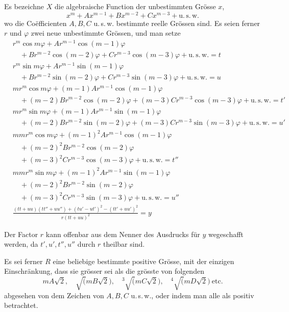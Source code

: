 Es bezeichne $X$ die algebraische Function der unbestimmten Grösse $x$,
\[
x^m+Ax^{m-1}+Bx^{m-2}+Cx^{m-3}+\mathrm{u.\,s.\,w.}
\]
wo die Coëfficienten $A,B,C$ u.\,s.\,w. bestimmte reelle
Grössen sind. Es seien ferner $r$ und $\varphi$ zwei neue unbestimmte
Grössen, und man setze
\[
\begin{aligned}
&r^m\cos m\varphi+Ar^{m-1}\cos(m-1)\varphi
\\
&\quad+Br^{m-2}\cos(m-2)\varphi+Cr^{m-3}\cos(m-3)\varphi
+\mathrm{u.\,s.\,w.}=t\\
&r^m\sin m\varphi+Ar^{m-1}\sin(m-1)\varphi
\\
&\quad+Br^{m-2}\sin(m-2)\varphi+Cr^{m-3}\sin(m-3)\varphi
+\mathrm{u.\,s.\,w.}=u\\
&mr^m\cos m\varphi+(m-1)Ar^{m-1}\cos(m-1)\varphi
\\
&\quad+(m-2)Br^{m-2}\cos(m-2)\varphi+(m-3)Cr^{m-3}\cos(m-3)\varphi
+\mathrm{u.\,s.\,w.}=t'\\
&mr^m\sin m\varphi+(m-1)Ar^{m-1}\sin(m-1)\varphi
\\
&\quad+(m-2)Br^{m-2}\sin(m-2)\varphi+(m-3)Cr^{m-3}\sin(m-3)\varphi
+\mathrm{u.\,s.\,w.}=u'\\
&mmr^m\cos m\varphi+(m-1)^2Ar^{m-1}\cos(m-1)\varphi
\\
&\quad+(m-2)^2Br^{m-2}\cos(m-2)\varphi\\
&\quad+(m-3)^2Cr^{m-3}\cos(m-3)\varphi
+\mathrm{u.\,s.\,w.}=t''\\
&mmr^m\sin m\varphi+(m-1)^2Ar^{m-1}\sin(m-1)\varphi
\\
&\quad+(m-2)^2Br^{m-2}\sin(m-2)\varphi\\
&\quad+(m-3)^2Cr^{m-3}\sin(m-3)\varphi
+\mathrm{u.\,s.\,w.}=u''\\
&\frac{(tt+uu)(tt''+uu'')+(tu'-ut')^2-(tt'+uu')^2}
{r(tt+uu)^2}=y
\end{aligned}
\]



Der Factor $r$ kann offenbar aus dem Nenner des Ausdrucks für $y$
wegeschafft werden, da $t',u',t'',u''$ durch $r$ theilbar sind.

Es sei ferner $R$ eine beliebige bestimmte positive Grösse, mit der
einzigen Einschränkung, dass sie grösser sei als die grösste von folgenden
\[
mA\surd2,\quad\surd(mB\surd2),\quad
{}^3\!\surd(mC\surd2),\quad{}^4\!\surd(mD\surd2)\ \mathrm{etc.}
\]
abgesehen von dem Zeichen von $A,B,C$ u.\,s.\,w., oder indem man
alle als positiv betrachtet.

